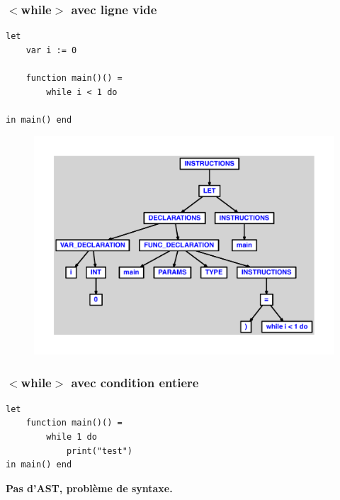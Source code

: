\documentclass{article}
\begin{document}
\subsubsection{$ < $while$ > $ avec ligne vide}
\begin{lstlisting}
let
	var i := 0

	function main()() =
		while i < 1 do

in main() end
\end{lstlisting}
\newpage
\begin{figure}[H]
\centering
\includegraphics[max width=\textwidth]{ast/ast_334.pdf}
\end{figure}
\newpage
\subsubsection{$ < $while$ > $ avec condition entiere}
\begin{lstlisting}
let
	function main()() =
		while 1 do
			print("test")
in main() end
\end{lstlisting}
\newpage
{\color{red}\textbf{Pas d'AST, problème de syntaxe.}}
\newpage
\end{document}
